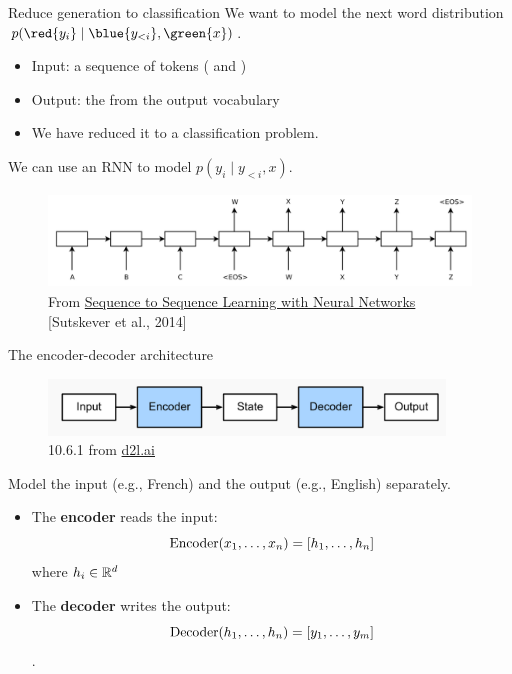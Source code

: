 \documentclass[usenames,dvipsnames,notes,11pt,aspectratio=169,hyperref={colorlinks=true, linkcolor=blue}]{beamer}
\begin{document}
\begin{frame}
    {Reduce generation to classification}
    We want to model the {next word distribution} $p(\red{y_i}\mid \blue{y_{<i}}, \green{x})$.\\
    \begin{itemize}[<+->]
        \item Input: a sequence of tokens ( and )
        \item Output: the  from the output vocabulary
        \item We have reduced it to a classification problem.
    \end{itemize}

    \pause
    We can use an RNN to model $p(y_i\mid {y_{<i}}, {x})$.
    \begin{figure}
        \includegraphics[height=2.5cm]{figures/s2s-ilya}
        \caption{From \href{https://arxiv.org/abs/1409.3215}{Sequence to Sequence Learning with Neural Networks} [Sutskever et al., 2014]}
    \end{figure}
\end{frame}

\begin{frame}
    {The encoder-decoder architecture}
    \begin{figure}
        \includegraphics[height=1.5cm]{figures/enc-dec}
        \caption{10.6.1 from \href{https://d2l.ai/chapter_recurrent-modern/encoder-decoder.html}{d2l.ai}}
    \end{figure}
    \vspace{-1em}

    Model the {input} (e.g., French) and the {output} (e.g., English) separately.\\
    \pause
    \begin{itemize}
        \item The \textbf{encoder} reads the input:
            $$
            \mathrm{Encoder}(x_1,\ldots,x_n) = \left[ h_1,\ldots,h_n \right]$$ where $h_i\in\mathbb{R}^d$
        \pause
        \item The \textbf{decoder}  writes the output:
            $$\mathrm{Decoder}(h_1,\ldots,h_n) = \left[ y_1,\ldots, y_m \right]$$.
    \end{itemize}
\end{frame}
\end{document}

